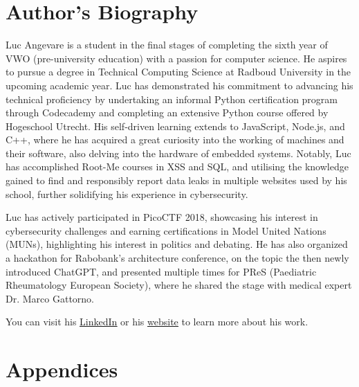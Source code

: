 \documentclass[a4paper,12pt]{report}
\begin{document}
\newpage

\section{Author's Biography} \label{sect:author-biography}
\hspace{10mm} Luc Angevare is a student in the final stages of completing the sixth year of VWO (pre-university education) with a passion for computer science. He aspires to pursue a degree in Technical Computing Science at Radboud University in the upcoming academic year. Luc has demonstrated his commitment to advancing his technical proficiency by undertaking an informal Python certification program through Codecademy and completing an extensive Python course offered by Hogeschool Utrecht. His self-driven learning extends to JavaScript, Node.js, and C++, where he has acquired a great curiosity into the working of machines and their software, also delving into the hardware of embedded systems. Notably, Luc has accomplished Root-Me courses in XSS and SQL, and utilising the knowledge gained to find and responsibly report data leaks in multiple websites used by his school, further solidifying his experience in cybersecurity.

Luc has actively participated in PicoCTF 2018, showcasing his interest in cybersecurity challenges and earning certifications in Model United Nations (MUNs), highlighting his interest in politics and debating. He has also organized a hackathon for Rabobank’s architecture conference, on the topic the then newly introduced ChatGPT, and presented multiple times for PReS (Paediatric Rheumatology European Society), where he shared the stage with medical expert Dr. Marco Gattorno.

You can visit his \underline{\href{https://www.linkedin.com/in/luc-angevare/}{LinkedIn}} or his \underline{\href{https://lucangevare.nl/}{website}} to learn more about his work.

\newpage
\section{Appendices} \label{sect:appendices}
\end{document}
